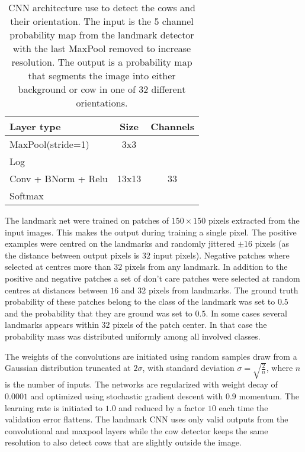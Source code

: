 \documentclass[10pt,a4paper,twocolumn]{article}
\begin{document}
\begin{table}
\begin{center}
\begin{tabular}{|l|c|c|}
\hline
\textbf{Layer type} & \textbf{Size} & \textbf{Channels} \\
\hline

MaxPool(stride=1) & 3x3 &  \\
Log & & \\
Conv + BNorm + Relu & 13x13 & 33 \\
Softmax & & \\
\hline
\end{tabular}
\end{center}
\caption{CNN architecture use to detect the cows and their orientation. The input is the 5 channel probability map from the landmark detector with the last MaxPool removed to increase resolution. The output is a probability map that segments the image into either background or cow in one of 32 different orientations.}
\label{tab:cowdirnet}
\end{table}

The landmark net were trained on patches of $150\times 150$ pixels extracted from the input images. This makes the output during training a single pixel. The positive examples were centred on the landmarks and randomly jittered $\pm 16$ pixels (as the distance between output pixels is $32$ input pixels). Negative patches where selected at centres more than $32$ pixels from any landmark. In addition to the positive and negative patches a set of don't care patches were selected at random centres at distances between $16$ and $32$ pixels from landmarks. The ground truth probability of these patches belong to the class of the landmark was set to $0.5$ and the probability that they are ground was set to $0.5$. In some cases several landmarks appears within $32$ pixels of the patch center. In that case the probability mass was distributed uniformly among all involved classes.

The weights of the convolutions are initiated using random samples draw from a Gaussian
distribution truncated at $2\sigma$, with standard deviation $\sigma=\sqrt{\frac{2}{n}}$,
where $n$ is the number of inputs\cite{DBLP:journals/corr/HeZR015}. The networks are regularized with weight decay of
$0.0001$ and optimized using stochastic gradient descent with $0.9$ momentum. The
learning rate is initiated to $1.0$ and reduced by a factor $10$ each time the validation
error flattens. The landmark CNN uses only valid outputs from the convolutional and maxpool
layers while the cow detector keeps the same resolution to also detect cows that are
slightly outside the image.
\end{document}
